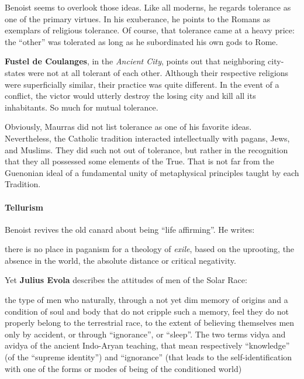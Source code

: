 Benoist seems to overlook those ideas. Like all moderns, he regards tolerance as one of the primary virtues. In his exuberance, he points to the Romans as exemplars of religious tolerance. Of course, that tolerance came at a heavy price: the ``other'' was tolerated as long as he subordinated his own gods to Rome.

\textbf{Fustel de Coulanges}, in the \textit{Ancient City}, points out that neighboring city-states were not at all tolerant of each other. Although their respective religions were superficially similar, their practice was quite different. In the event of a conflict, the victor would utterly destroy the losing city and kill all its inhabitants. So much for mutual tolerance.

Obviously, Maurras did not list tolerance as one of his favorite ideas. Nevertheless, the Catholic tradition interacted intellectually with pagans, Jews, and Muslims. They did such not out of tolerance, but rather in the recognition that they all possessed some elements of the True. That is not far from the Guenonian ideal of a fundamental unity of metaphysical principles taught by each Tradition.

\paragraph{Tellurism}


Benoist revives the old canard about being ``life affirming''. He writes:

\begin{quotex}
there is no place in paganism for a theology of \emph{exile}, based on the uprooting, the absence in the world, the absolute distance or critical negativity.
\end{quotex}


Yet \textbf{Julius Evola} describes the attitudes of men of the Solar Race:

\begin{quotex}
the type of men who naturally, through a not yet dim memory of origins and a condition of soul and body that do not cripple such a memory, feel they do not properly belong to the terrestrial race, to the extent of believing themselves men only by accident, or through ``ignorance'', or ``sleep''. The two terms vidya and avidya of the ancient Indo-Aryan teaching, that mean respectively ``knowledge'' (of the ``supreme identity'') and ``ignorance'' (that leads to the self-identification with one of the forms or modes of being of the conditioned world)
\end{quotex}


